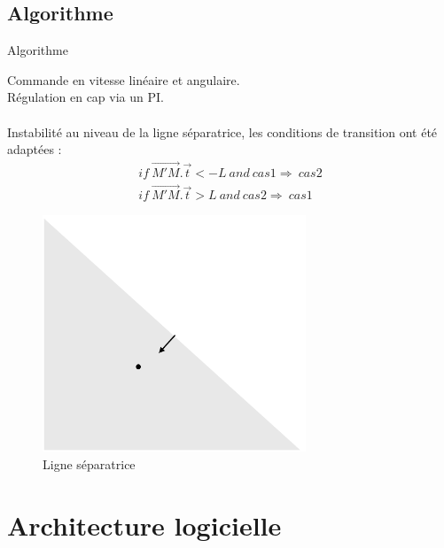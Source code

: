\documentclass[pdftex,beamer,aspectratio=169]{beamer}
\theoremstyle{definition}
\theoremstyle{example}
\theoremstyle{plain}
\begin{document}
\subsection{Algorithme}
\begin{frame}[fragile]{Algorithme}
  \begin{minipage}{0.5\textwidth}
    Commande en vitesse linéaire et angulaire. \\
    Régulation en cap via un PI. \\ \\
    Instabilité au niveau de la ligne séparatrice, les conditions de transition ont été adaptées : 
    \begin{eqnarray}
        if \ \overrightarrow{M'M} . \overrightarrow{t}<-L \ and \ cas 1 \Rightarrow  \ cas 2 \\
        if \ \overrightarrow{M'M} . \overrightarrow{t}>L \ and \ cas 2 \Rightarrow  \ cas 1
    \end{eqnarray}
  \end{minipage}
  \begin{minipage}{0.49\textwidth}
    \begin{figure}[H]
      \centering
      \includegraphics[width=0.7\textwidth]{ligneSep.png}
      \caption{Ligne séparatrice}
    \end{figure}
  \end{minipage}
\end{frame}

\section{Architecture logicielle}
\end{document}
